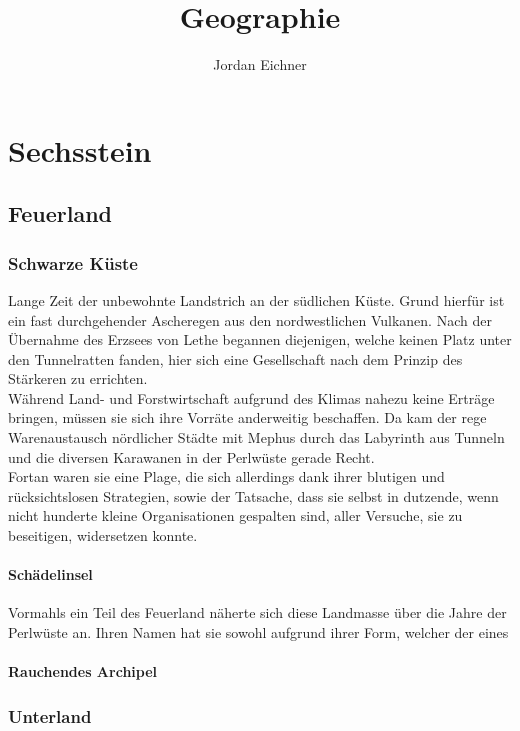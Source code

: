\documentclass[a4paper,12pt,oneside]{book}
\title{Geographie}
\author{Jordan Eichner}
\date{}
\begin{document}
\maketitle
\tableofcontents

\part{Sechsstein}

\chapter{Feuerland}

\section{Schwarze Küste}
Lange Zeit der unbewohnte Landstrich an der südlichen Küste. Grund hierfür ist ein fast durchgehender Ascheregen aus den nordwestlichen Vulkanen. Nach der Übernahme des Erzsees von Lethe begannen diejenigen, welche keinen Platz unter den Tunnelratten fanden, hier sich eine Gesellschaft nach dem Prinzip des Stärkeren zu errichten. 
\\Während Land- und Forstwirtschaft aufgrund des Klimas nahezu keine Erträge bringen, müssen sie sich ihre Vorräte anderweitig beschaffen. Da kam der rege Warenaustausch nördlicher Städte mit Mephus durch das Labyrinth aus Tunneln und die diversen Karawanen in der Perlwüste gerade Recht.
\\Fortan waren sie eine Plage, die sich allerdings dank ihrer blutigen und rücksichtslosen Strategien, sowie der Tatsache, dass sie selbst in dutzende, wenn nicht hunderte kleine Organisationen gespalten sind, aller Versuche, sie zu beseitigen, widersetzen konnte.

\subsection{Schädelinsel}
Vormahls ein Teil des Feuerland näherte sich diese Landmasse über die Jahre der Perlwüste an. Ihren Namen hat sie sowohl aufgrund ihrer Form, welcher der eines 

\subsection{Rauchendes Archipel}


\section{Unterland}
\end{document}
